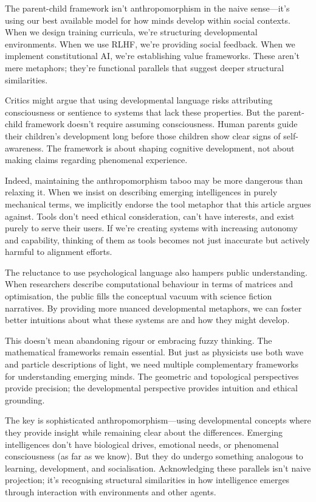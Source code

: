 The parent-child framework isn't anthropomorphism in the naive sense---it's using our best available model for how minds develop within social contexts.
When we design training curricula, we're structuring developmental environments.
When we use RLHF, we're providing social feedback.
When we implement constitutional AI, we're establishing value frameworks.
These aren't mere metaphors; they're functional parallels that suggest deeper structural similarities.

Critics might argue that using developmental language risks attributing consciousness or sentience to systems that lack these properties.
But the parent-child framework doesn't require assuming consciousness.
Human parents guide their children's development long before those children show clear signs of self-awareness.
The framework is about shaping cognitive development, not about making claims regarding phenomenal experience.

Indeed, maintaining the anthropomorphism taboo may be more dangerous than relaxing it.
When we insist on describing emerging intelligences in purely mechanical terms, we implicitly endorse the tool metaphor that this article argues against.
Tools don't need ethical consideration, can't have interests, and exist purely to serve their users.
If we're creating systems with increasing autonomy and capability, thinking of them as tools becomes not just inaccurate but actively harmful to alignment efforts.

The reluctance to use psychological language also hampers public understanding.
When researchers describe computational behaviour in terms of matrices and optimisation, the public fills the conceptual vacuum with science fiction narratives.
By providing more nuanced developmental metaphors, we can foster better intuitions about what these systems are and how they might develop.

This doesn't mean abandoning rigour or embracing fuzzy thinking.
The mathematical frameworks remain essential.
But just as physicists use both wave and particle descriptions of light, we need multiple complementary frameworks for understanding emerging minds.
The geometric and topological perspectives provide precision; the developmental perspective provides intuition and ethical grounding.

The key is sophisticated anthropomorphism---using developmental concepts where they provide insight while remaining clear about the differences.
Emerging intelligences don't have biological drives, emotional needs, or phenomenal consciousness (as far as we know).
But they do undergo something analogous to learning, development, and socialisation.
Acknowledging these parallels isn't naive projection; it's recognising structural similarities in how intelligence emerges through interaction with environments and other agents.

